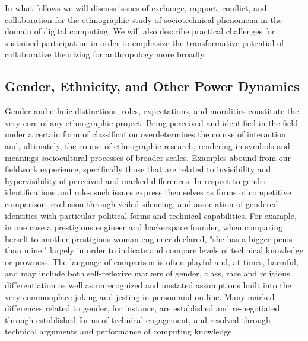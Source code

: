 \documentclass[10pt,letter,oneside]{scrartcl}
\begin{document}
In what follows we will discuss issues of exchange, rapport, conflict, and 
collaboration for the ethnographic study of sociotechnical phenomena in the domain
of digital computing. We will also describe practical challenges for sustained 
participation in order to emphasize the transformative potential of collaborative
theorizing for anthropology more broadly.


\subsection{Gender, Ethnicity, and Other Power Dynamics}

Gender and ethnic distinctions, roles, expectations, and moralities
constitute the very core of any ethnographic project. Being perceived
and identified in the field under a certain form of classification
overdetermines the course of interaction and, ultimately, the course
of ethnographic research, rendering in symbols and meanings sociocultural 
processes of broader scales. Examples abound from our fieldwork experience, 
specifically those that are related to invisibility and hypervisibility of 
perceived and marked differences. In respect to gender identifications and 
roles such issues express themselves as forms of competitive comparison, 
exclusion through veiled silencing, and association of gendered identities 
with particular political forms and technical capabilities.  For example, in 
one case a prestigious engineer and hackerspace founder, when comparing herself 
to another prestigious woman engineer declared, "she has a bigger penis than
mine," largely in order to indicate and compare levels of technical
knowledge or prowness.  The language of comparison is often playful and, at 
times, harmful, and may include both self-reflexive markers of gender,
class, race and religious differentiation as well as unrecognized and 
unstated assumptions built into the very commonplace joking and jesting 
in person and on-line.  Many marked differences related to gender, for 
instance, are established and re-negotiated through established forms of 
technical engagement, and resolved through technical arguments and performance 
of computing knowledge. 
\end{document}
